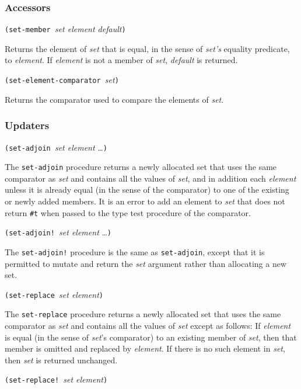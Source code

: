 \hypertarget{Accessors}{\subsubsection{Accessors}\label{Accessors}}

\texttt{(set-member\ }\emph{set element default}\texttt{)}

Returns the element of \emph{set} that is equal, in the sense of
\emph{set's} equality predicate, to \emph{element}. If \emph{element} is
not a member of \emph{set}, \emph{default} is returned.

\texttt{(set-element-comparator\ }\emph{set}\texttt{)}

Returns the comparator used to compare the elements of \emph{set}.

\hypertarget{Updaters}{\subsubsection{Updaters}\label{Updaters}}

\texttt{(set-adjoin\ }\emph{set element} \ldots{}\texttt{)}

The \texttt{set-adjoin} procedure returns a newly allocated set that
uses the same comparator as \emph{set} and contains all the values of
\emph{set}, and in addition each \emph{element} unless it is already
equal (in the sense of the comparator) to one of the existing or newly
added members. It is an error to add an element to \emph{set} that does
not return \texttt{\#t} when passed to the type test procedure of the
comparator.

\texttt{(set-adjoin!\ }\emph{set element} \ldots{}\texttt{)}

The \texttt{set-adjoin!} procedure is the same as \texttt{set-adjoin},
except that it is permitted to mutate and return the \emph{set} argument
rather than allocating a new set.

\texttt{(set-replace\ }\emph{set element}\texttt{)}

The \texttt{set-replace} procedure returns a newly allocated set that
uses the same comparator as \emph{set} and contains all the values of
\emph{set} except as follows: If \emph{element} is equal (in the sense
of \emph{set}'s comparator) to an existing member of \emph{set}, then
that member is omitted and replaced by \emph{element}. If there is no
such element in \emph{set}, then \emph{set} is returned unchanged.

\texttt{(set-replace!\ }\emph{set element}\texttt{)}

